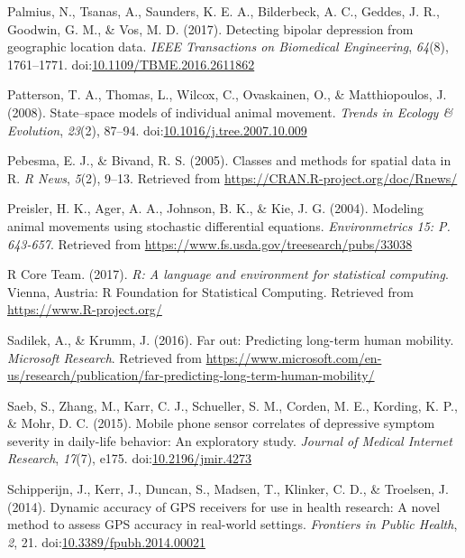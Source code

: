 \documentclass[man]{apa6}
\theoremstyle{definition}
\theoremstyle{definition}
\theoremstyle{definition}
\theoremstyle{remark}
\begin{document}
\hypertarget{ref-palmius_detecting_2017}{}
Palmius, N., Tsanas, A., Saunders, K. E. A., Bilderbeck, A. C., Geddes,
J. R., Goodwin, G. M., \& Vos, M. D. (2017). Detecting bipolar
depression from geographic location data. \emph{IEEE Transactions on
Biomedical Engineering}, \emph{64}(8), 1761--1771.
doi:\href{https://doi.org/10.1109/TBME.2016.2611862}{10.1109/TBME.2016.2611862}

\hypertarget{ref-patterson_statespace_2008}{}
Patterson, T. A., Thomas, L., Wilcox, C., Ovaskainen, O., \&
Matthiopoulos, J. (2008). State--space models of individual animal
movement. \emph{Trends in Ecology \& Evolution}, \emph{23}(2), 87--94.
doi:\href{https://doi.org/10.1016/j.tree.2007.10.009}{10.1016/j.tree.2007.10.009}

\hypertarget{ref-R-sp}{}
Pebesma, E. J., \& Bivand, R. S. (2005). Classes and methods for spatial
data in R. \emph{R News}, \emph{5}(2), 9--13. Retrieved from
\url{https://CRAN.R-project.org/doc/Rnews/}

\hypertarget{ref-preisler_modeling_2004}{}
Preisler, H. K., Ager, A. A., Johnson, B. K., \& Kie, J. G. (2004).
Modeling animal movements using stochastic differential equations.
\emph{Environmetrics 15: P. 643-657}. Retrieved from
\url{https://www.fs.usda.gov/treesearch/pubs/33038}

\hypertarget{ref-R-base}{}
R Core Team. (2017). \emph{R: A language and environment for statistical
computing}. Vienna, Austria: R Foundation for Statistical Computing.
Retrieved from \url{https://www.R-project.org/}

\hypertarget{ref-sadilek_far_2016}{}
Sadilek, A., \& Krumm, J. (2016). Far out: Predicting long-term human
mobility. \emph{Microsoft Research}. Retrieved from
\url{https://www.microsoft.com/en-us/research/publication/far-predicting-long-term-human-mobility/}

\hypertarget{ref-saeb_mobile_2015}{}
Saeb, S., Zhang, M., Karr, C. J., Schueller, S. M., Corden, M. E.,
Kording, K. P., \& Mohr, D. C. (2015). Mobile phone sensor correlates of
depressive symptom severity in daily-life behavior: An exploratory
study. \emph{Journal of Medical Internet Research}, \emph{17}(7), e175.
doi:\href{https://doi.org/10.2196/jmir.4273}{10.2196/jmir.4273}

\hypertarget{ref-schipperijn_dynamic_2014}{}
Schipperijn, J., Kerr, J., Duncan, S., Madsen, T., Klinker, C. D., \&
Troelsen, J. (2014). Dynamic accuracy of GPS receivers for use in health
research: A novel method to assess GPS accuracy in real-world settings.
\emph{Frontiers in Public Health}, \emph{2}, 21.
doi:\href{https://doi.org/10.3389/fpubh.2014.00021}{10.3389/fpubh.2014.00021}
\end{document}
